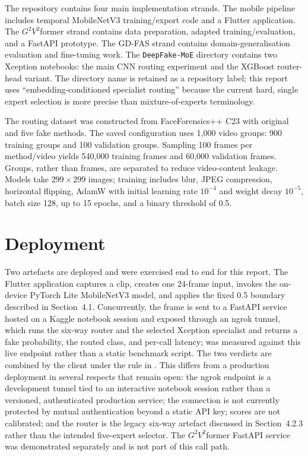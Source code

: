 The repository contains four main implementation strands. The mobile pipeline
includes temporal MobileNetV3 training/export code and a Flutter application. The
$G^2V^2$former strand contains data preparation, adapted training/evaluation, and
a FastAPI prototype. The GD-FAS strand contains domain-generalisation evaluation
and fine-tuning work. The \texttt{DeepFake-MoE} directory contains two Xception
notebooks: the main CNN routing experiment and the XGBoost router-head variant.
The directory name is retained as a repository label; this report uses
``embedding-conditioned specialist routing'' because the current hard, single
expert selection is more precise than mixture-of-experts terminology.

The routing dataset was constructed from FaceForensics++ C23 with original and
five fake methods. The saved configuration uses 1,000 video groups: 900 training
groups and 100 validation groups. Sampling 100 frames per method/video yields
540,000 training frames and 60,000 validation frames. Groups, rather than frames,
are separated to reduce video-content leakage. Models take $299\times299$ images;
training includes blur, JPEG compression, horizontal flipping, AdamW with initial
learning rate $10^{-4}$ and weight decay $10^{-5}$, batch size 128, up to 15
epochs, and a binary threshold of 0.5.

\section{Deployment}

Two artefacts are deployed and were exercised end to end for this report. The
Flutter application captures a clip, creates one 24-frame input, invokes the
on-device PyTorch Lite MobileNetV3 model, and applies the fixed 0.5 boundary
described in Section~4.1. Concurrently, the frame is sent to a FastAPI service
hosted on a Kaggle notebook session and exposed through an ngrok tunnel, which
runs the six-way router and the selected Xception specialist and returns a fake
probability, the routed class, and per-call latency;  was
measured against this live endpoint rather than a static benchmark script. The
two verdicts are combined by the client under the rule in
. This differs from a production deployment in
several respects that remain open: the ngrok endpoint is a development tunnel
tied to an interactive notebook session rather than a versioned, authenticated
production service; the connection is not currently protected by mutual
authentication beyond a static API key; scores are not calibrated; and the
router is the legacy six-way artefact discussed in Section~4.2.3 rather than the
intended five-expert selector. The $G^2V^2$former FastAPI service was
demonstrated separately and is not part of this call path.

